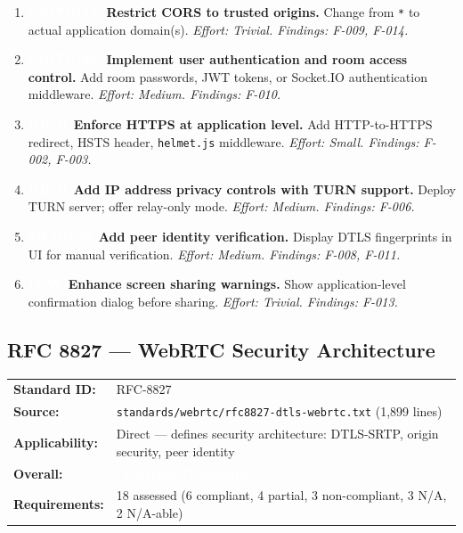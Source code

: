 \documentclass[11pt,letterpaper]{article}
\newcommand{\partiallycompliant}{\colorbox{noncompliant}{\textcolor{white}{\textbf{\small~Partially Compliant~}}}}
\newcommand{\pricritical}{\colorbox{critical}{\textcolor{white}{\small\textbf{CRITICAL}}}}
\newcommand{\prihigh}{\colorbox{major}{\textcolor{white}{\small\textbf{HIGH}}}}
\newcommand{\primedium}{\colorbox{minor!80!black}{\textcolor{white}{\small\textbf{MEDIUM}}}}
\newcommand{\prilow}{\colorbox{notapplicable}{\textcolor{white}{\small\textbf{LOW}}}}
\begin{document}
\begin{enumerate}[leftmargin=2em]
    \item \pricritical\ \textbf{Restrict CORS to trusted origins.} Change from \texttt{*} to actual application domain(s). \textit{Effort: Trivial. Findings: F-009, F-014.}
    \item \pricritical\ \textbf{Implement user authentication and room access control.} Add room passwords, JWT tokens, or Socket.IO authentication middleware. \textit{Effort: Medium. Findings: F-010.}
    \item \prihigh\ \textbf{Enforce HTTPS at application level.} Add HTTP-to-HTTPS redirect, HSTS header, \texttt{helmet.js} middleware. \textit{Effort: Small. Findings: F-002, F-003.}
    \item \prihigh\ \textbf{Add IP address privacy controls with TURN support.} Deploy TURN server; offer relay-only mode. \textit{Effort: Medium. Findings: F-006.}
    \item \primedium\ \textbf{Add peer identity verification.} Display DTLS fingerprints in UI for manual verification. \textit{Effort: Medium. Findings: F-008, F-011.}
    \item \prilow\ \textbf{Enhance screen sharing warnings.} Show application-level confirmation dialog before sharing. \textit{Effort: Trivial. Findings: F-013.}
\end{enumerate}

\newpage

\subsection{RFC 8827 --- WebRTC Security Architecture}

\begin{tabular}{ll}
\textbf{Standard ID:} & RFC-8827 \\
\textbf{Source:} & \texttt{standards/webrtc/rfc8827-dtls-webrtc.txt} (1,899 lines) \\
\textbf{Applicability:} & Direct --- defines security architecture: DTLS-SRTP, origin security, peer identity \\
\textbf{Overall:} & \partiallycompliant \\
\textbf{Requirements:} & 18 assessed (6 compliant, 4 partial, 3 non-compliant, 3 N/A, 2 N/A-able) \\
\end{tabular}
\end{document}
